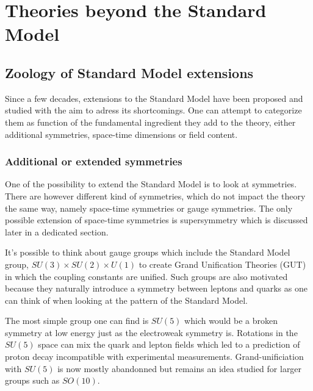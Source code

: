     \section{Theories beyond the Standard Model}

        \subsection{Zoology of Standard Model extensions}

        Since a few decades, extensions to the Standard Model have been proposed and
        studied with the aim to adress its shortcomings. One can attempt to categorize
        them as function of the fundamental ingredient they add to the theory, either
        additional symmetries, space-time dimensions or field content.

            \subsubsection{Additional or extended symmetries}

        One of the possibility to extend the Standard Model is to look at symmetries.
        There are however different kind of symmetries, which do not impact the theory
        the same way, namely space-time symmetries or gauge symmetries. The only possible
        extension of space-time symmetries is supersymmetry which is discussed later
        in a dedicated section.

        It's possible to think about gauge groups which include the Standard Model group,
        $SU(3) \times SU(2) \times U(1)$ to create Grand Unification Theories (GUT) in which
        the coupling constants are unified. Such groups are also motivated because they
        naturally introduce a symmetry between leptons and quarks as one can think of
        when looking at the pattern of the Standard Model.

        The most simple group one can find is $SU(5)$ which would be a broken symmetry at
        low energy just as the electroweak symmetry is. Rotations in the $SU(5)$ space
        can mix the quark and lepton fields which led to a prediction of proton decay
        incompatible with experimental measurements. Grand-unificiation with $SU(5)$ is
        now mostly abandonned but remains an idea studied for larger groups such as $SO(10)$.

